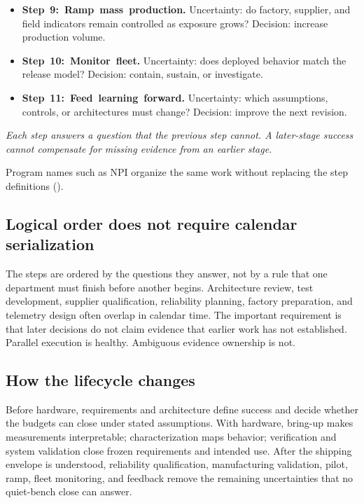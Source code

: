 {\begin{minipage}{\dimexpr\textwidth-2\fboxsep-2\fboxrule\relax}
{\begin{itemize}
      restrict, or roll back.
\item \mbox{\textbf{Step 9: Ramp mass production.}} Uncertainty: do factory,
      supplier, and field indicators remain controlled as exposure grows?
      Decision: increase production volume.
\item \mbox{\textbf{Step 10: Monitor fleet.}} Uncertainty: does deployed
      behavior match the release model? Decision: contain, sustain, or
      investigate.
\item \mbox{\textbf{Step 11: Feed learning forward.}} Uncertainty: which
      assumptions, controls, or architectures must change? Decision: improve
      the next revision.
\end{itemize}
\textit{Each step answers a question that the previous step cannot. A
later-stage success cannot compensate for missing evidence from an earlier
stage.}\par}
\end{minipage}%
}%
\endgraf\medskip

Program names such as
NPI
organize the same work without replacing the step definitions
().

\subsection{Logical order does not require calendar serialization}

The steps are ordered by the questions they answer, not by a rule that one
department must finish before another begins. Architecture review, test
development, supplier qualification, reliability planning, factory preparation,
and telemetry design often overlap in calendar time. The important requirement
is that later decisions do not claim evidence that earlier work has not
established. Parallel execution is healthy. Ambiguous evidence ownership is not.

\subsection{How the lifecycle changes}

Before hardware, requirements and architecture define success and decide whether
the budgets can close under stated assumptions. With hardware, bring-up makes
measurements interpretable; characterization maps behavior; verification and
system validation close frozen requirements and intended use. After the shipping
envelope is understood, reliability qualification, manufacturing validation,
pilot, ramp, fleet monitoring, and feedback remove the remaining uncertainties
that no quiet-bench close can answer.

